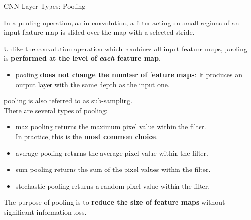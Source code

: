 %
%
%

\begin{frame}[t,allowframebreaks]{CNN Layer Types: Pooling -}

    In a \gls{pooling} operation, as in convolution, 
    a \gls{filter} acting on small regions of an input 
    \gls{feature map}
    is slided over the map with a selected \gls{stride}.\\
    \vspace{0.2cm}

    Unlike the convolution operation which combines 
    all input \glspl{feature map},  
    \gls{pooling} is {\bf performed 
    at the level of {\em each} \gls{feature map}}.
    \begin{itemize}
        \item 
        \Gls{pooling} {\bf does not change the number of \glspl{feature map}}:
        It produces an output layer with the same depth as the input one.
    \end{itemize}
    \vspace{0.1cm}
    \Gls{pooling} is also referred to as \gls{sub-sampling}.\\
    \vspace{0.2cm}
    There are several types of \gls{pooling}:
    \begin{itemize}
        \item 
        \Gls{max pooling} 
        returns the maximum pixel value within the filter.\\
        In practice, this is the {\bf most common choice}.
        \item 
        \Gls{average pooling} 
        returns the average pixel value within the filter.
        \item 
        \Gls{sum pooling} 
        returns the sum of the pixel values within the filter.
        \item 
        \Gls{stochastic pooling} 
        returns a random pixel value within the filter.
    \end{itemize}

    \framebreak

    The purpose of \gls{pooling} is to 
    {\bf reduce the size of feature maps} without significant information loss.\\
    \vspace{0.2cm}


\end{frame}
